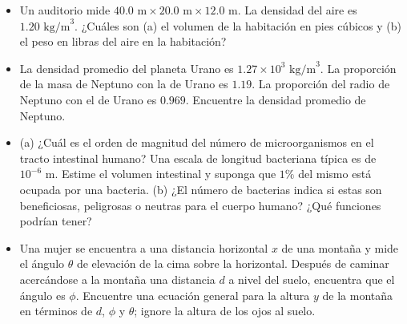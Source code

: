 \documentclass[11pt,a4paper]{article}
\begin{document}
\begin{itemize}
    \item[\textbf{5.}] Un auditorio mide $40.0 \text{ m} \times 20.0 \text{ m} \times 12.0 \text{ m}$. La densidad del aire es $1.20 \text{ kg/m}^3$. ¿Cuáles son (a) el volumen de la habitación en pies cúbicos y (b) el peso en libras del aire en la habitación?
    \vspace*{6cm}

    \item[\textbf{6.}] La densidad promedio del planeta Urano es $1.27 \times 10^3 \text{ kg/m}^3$. La proporción de la masa de Neptuno con la de Urano es $1.19$. La proporción del radio de Neptuno con el de Urano es $0.969$. Encuentre la densidad promedio de Neptuno.
    \vspace*{6cm}

    \item[\textbf{7.}] (a) ¿Cuál es el orden de magnitud del número de microorganismos en el tracto intestinal humano? Una escala de longitud bacteriana típica es de $10^{-6} \text{ m}$. Estime el volumen intestinal y suponga que $1\%$ del mismo está ocupada por una bacteria. (b) ¿El número de bacterias indica si estas son beneficiosas, peligrosas o neutras para el cuerpo humano? ¿Qué funciones podrían tener?
    \vspace*{6cm}

    \item[\textbf{8.}] Una mujer se encuentra a una distancia horizontal $x$ de una montaña y mide el ángulo $\theta$ de elevación de la cima sobre la horizontal. Después de caminar acercándose a la montaña una distancia $d$ a nivel del suelo, encuentra que el ángulo es $\phi$. Encuentre una ecuación general para la altura $y$ de la montaña en términos de $d$, $\phi$ y $\theta$; ignore la altura de los ojos al suelo.
    \vspace*{7cm}
\end{itemize}

\newpage
\end{document}
